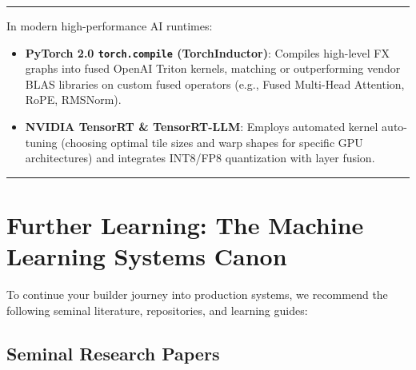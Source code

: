\documentclass[
  letterpaper,
]{scrbook}
\providecommand{\tightlist}{%
  \setlength{\itemsep}{0pt}\setlength{\parskip}{0pt}}
\begin{document}
\begin{center}\rule{0.5\linewidth}{0.5pt}\end{center}

\begin{tcolorbox}[enhanced jigsaw, arc=.35mm, bottomrule=.15mm, bottomtitle=1mm, breakable, colback=white, colbacktitle=quarto-callout-note-color!10!white, colframe=quarto-callout-note-color-frame, coltitle=black, left=2mm, leftrule=.75mm, opacityback=0, opacitybacktitle=0.6, rightrule=.15mm, title=\textcolor{quarto-callout-note-color}{\faInfo}\hspace{0.5em}{Production Systems Bridge: Compilers vs.~Handwritten Libraries}, titlerule=0mm, toprule=.15mm, toptitle=1mm]

In modern high-performance AI runtimes:

\begin{itemize}
\tightlist
\item
  \textbf{PyTorch 2.0 \texttt{torch.compile} (TorchInductor)}: Compiles
  high-level FX graphs into fused OpenAI Triton kernels, matching or
  outperforming vendor BLAS libraries on custom fused operators (e.g.,
  Fused Multi-Head Attention, RoPE, RMSNorm).
\item
  \textbf{NVIDIA TensorRT \& TensorRT-LLM}: Employs automated kernel
  auto-tuning (choosing optimal tile sizes and warp shapes for specific
  GPU architectures) and integrates INT8/FP8 quantization with layer
  fusion.
\end{itemize}

\end{tcolorbox}

\begin{center}\rule{0.5\linewidth}{0.5pt}\end{center}

\section{Further Learning: The Machine Learning Systems
Canon}\label{further-learning-the-machine-learning-systems-canon}

To continue your builder journey into production systems, we recommend
the following seminal literature, repositories, and learning guides:

\subsection{Seminal Research Papers}\label{seminal-research-papers}
\end{document}
